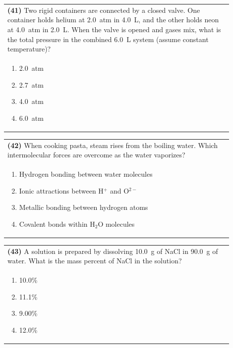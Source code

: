 \documentclass{article}
\begin{document}
\vspace{0.2cm}
\noindent\begin{tabular}{|p{0.9\linewidth}|}
\hline
\textbf{(41)} Two rigid containers are connected by a closed valve. One container holds helium at 2.0~atm in 4.0~L, and the other holds neon at 4.0~atm in 2.0~L. When the valve is opened and gases mix, what is the total pressure in the combined 6.0~L system (assume constant temperature)?\\[0.2cm]
\begin{minipage}[t]{0.85\linewidth}
\begin{enumerate}[label=\alph*.]
\item 2.0~atm
\item 2.7~atm
\item 4.0~atm
\item 6.0~atm
\end{enumerate}
\end{minipage}\\[0.2cm]
\hline
\end{tabular}

\vspace{0.2cm}
\noindent\begin{tabular}{|p{0.9\linewidth}|}
\hline
\textbf{(42)} When cooking pasta, steam rises from the boiling water. Which intermolecular forces are overcome as the water vaporizes?\\[0.2cm]
\begin{minipage}[t]{0.85\linewidth}
\begin{enumerate}[label=\alph*.]
\item Hydrogen bonding between water molecules
\item Ionic attractions between H$^+$ and O$^{2-}$
\item Metallic bonding between hydrogen atoms
\item Covalent bonds within H$_2$O molecules
\end{enumerate}
\end{minipage}\\[0.2cm]
\hline
\end{tabular}

\noindent\begin{tabular}{|p{0.9\linewidth}|}
\hline
\textbf{(43)} A solution is prepared by dissolving 10.0~g of NaCl in 90.0~g of water. What is the mass percent of NaCl in the solution?\\[0.2cm]
\begin{minipage}[t]{0.85\linewidth}
\begin{enumerate}[label=\alph*.]
\item 10.0\%
\item 11.1\%
\item 9.00\%
\item 12.0\%
\end{enumerate}
\end{minipage}\\[0.2cm]
\hline
\end{tabular}
\end{document}
